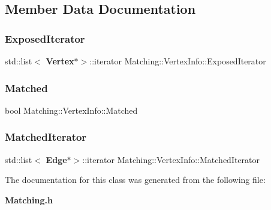 \subsection{Member Data Documentation}
\mbox{\label{classMatching_1_1VertexInfo_ad144234438700679eb3d17fdf624819b}} 
\subsubsection{Exposed\+Iterator}
{\footnotesize\ttfamily std\+::list$<$\textbf{ Vertex}$\ast$$>$\+::iterator Matching\+::\+Vertex\+Info\+::\+Exposed\+Iterator\hspace{0.3cm}{\ttfamily [private]}}

\mbox{\label{classMatching_1_1VertexInfo_af160302bc51731cf764115be564aab8f}} 
\subsubsection{Matched}
{\footnotesize\ttfamily bool Matching\+::\+Vertex\+Info\+::\+Matched\hspace{0.3cm}{\ttfamily [private]}}

\mbox{\label{classMatching_1_1VertexInfo_a41fd366f19d5733e39bd4fe038fc1809}} 
\subsubsection{Matched\+Iterator}
{\footnotesize\ttfamily std\+::list$<$\textbf{ Edge}$\ast$$>$\+::iterator Matching\+::\+Vertex\+Info\+::\+Matched\+Iterator\hspace{0.3cm}{\ttfamily [private]}}



The documentation for this class was generated from the following file\+:\begin{DoxyCompactItemize}
\item 
\textbf{ Matching.\+h}\end{DoxyCompactItemize}
